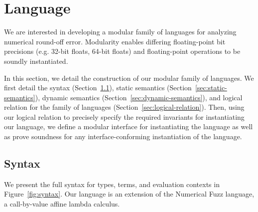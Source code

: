 \section{Language} \label{sec:lang}
We are interested in developing a modular family of languages for analyzing
numerical round-off error. Modularity enables differing floating-point bit
precisions (e.g. 32-bit floats, 64-bit floats) and floating-point operations to
be soundly instantiated.

In this section, we detail the construction of our modular family of languages.
We first detail the syntax (Section~\ref{sec:syntax}), static semantics
(Section~\ref{sec:static-semantics}), dynamic semantics
(Section~\ref{sec:dynamic-semantics}), and logical relation for the family of
languages (Section~\ref{sec:logical-relation}). Then, using our logical relation
to precisely specify the required invariants for instantiating our language, we
define a modular interface for instantiating the language as well as prove
soundness for any interface-conforming instantiation of the language. 
%
%

\subsection{Syntax} \label{sec:syntax}
We present the full syntax for types, terms, and evaluation contexts in
Figure~\ref{fig:syntax}. Our language is an extension of the Numerical Fuzz
\cite{NumFuzz} language, a call-by-value affine lambda calculus.

